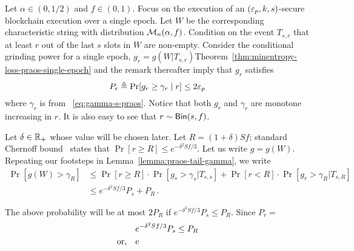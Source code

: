   Let $\alpha \in (0,1/2)$ and $f \in (0,1)$. 
  Focus on the execution of an $(\mathsf{\varepsilon}_p, k, s)$-secure blockchain execution over a single epoch.
  Let $W$ be the corresponding characteristic string with distribution $\mathcal{M}_n(\alpha, f)$.
  Condition on the event $T_{s,r}$ that at least $r$ out of the last $s$ slots in $W$ are non-empty. 
  Consider the conditional grinding power for a single epoch, $g_r = g(W | T_{s,r})$Theorem~\ref{thm:minentropy-loss-praos-single-epoch} and the remark thereafter 
  imply that $g_r$ satisfies  
  $$
    P_r \triangleq \Pr[ g_r \geq \gamma_r \mid r] \leq 2 \mathsf{\varepsilon}_p
  $$
  where $\gamma_r$ is from ~\eqref{eq:gamma-s-praos}. 
  Notice that both $g_r$ and $\gamma_r$ are monotone increasing in $r$.
  It is also easy to see that $r \sim \mathsf{Bin}(s, f)$.

  Let $\delta \in \mathbb{R}_+$ whose value will be chosen later.
  Let $R = (1+\delta) Sf$;  
  standard Chernoff bound~\cite{ChernoffBound} states that $\Pr[r \geq R] \leq e^{-\delta^2 Sf/3}$. 
  Let us write $g = g(W)$. 
  Repeating our footsteps in Lemma~\ref{lemma:praos-tail-gamma}, we write
  \begin{align*}
    \Pr[g(W) > \gamma_R] 
    &\leq \Pr[r \geq R] \cdot \Pr[g_s > \gamma_s | T_{s,s}] + \Pr[r < R] \cdot \Pr[g_r > \gamma_R | T_{s,R}] \\
    &\leq e^{-\delta^2 Sf/3} P_s + P_R
    \,.
  \end{align*}

  The above probability will be at most $2 P_R$ if $e^{-\delta^2 Sf/3} P_s \leq P_R$. 
  Since $P_r = $
  \begin{align*}
        & e^{-\delta^2 Sf/3} P_s \leq P_R \\ 
    \text{or,}\quad & e
  \end{align*}



